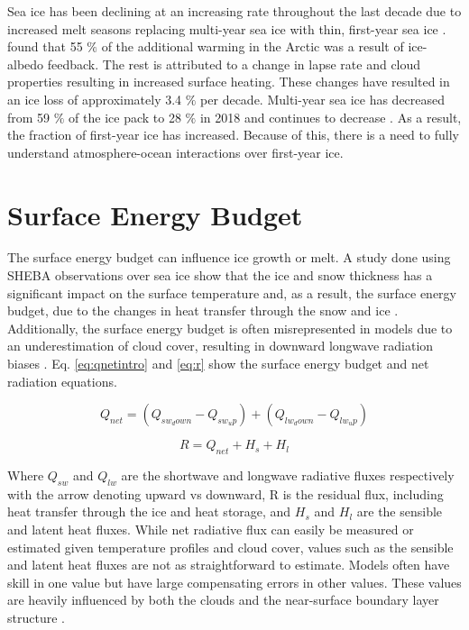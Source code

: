 Sea ice has been declining at an increasing rate throughout the last decade due to increased melt seasons replacing multi-year sea ice with thin, first-year sea ice \citep{meier:2014}. \citet{wunderling:2020} found that 55 $\%$ of the additional warming in the Arctic was a result of ice-albedo feedback. The rest is attributed to a change in lapse rate and cloud properties resulting in increased surface heating. These changes have resulted in an ice loss of approximately 3.4 $\%$ per decade. Multi-year sea ice has decreased from 59 $\%$ of the ice pack to 28 $\%$ in 2018 and continues to decrease \citep{stroeve:2018}. As a result, the fraction of first-year ice has increased.  Because of this, there is a need to fully understand atmosphere-ocean interactions over first-year ice. 

\section{Surface Energy Budget}
The surface energy budget can influence ice growth or melt. A study done using SHEBA observations over sea ice show that the ice and snow thickness has a significant impact on the surface temperature and, as a result, the surface energy budget, due to the changes in heat transfer through the snow and ice \citep{hines:2015}. Additionally, the surface energy budget is often misrepresented in models due to an underestimation of cloud cover, resulting in downward longwave radiation biases \citep{inoue:2008}. Eq. \ref{eq:qnetintro} and \ref{eq:r} show the surface energy budget and net radiation equations.

\begin{equation}\label{eq:qnetintrointro}
Q_{net} = (Q_{sw_down} - Q_{sw_up}) + (Q_{lw_down} - Q_{lw_up})
\end{equation}

\begin{equation}\label{eq:r}
R = Q_{net} + H_{s} + H_{l}
\end{equation}

Where $Q_{sw}$ and $Q_{lw}$ are the shortwave and longwave radiative fluxes respectively with the arrow denoting upward vs downward, R is the residual flux, including heat transfer through the ice and heat storage, and $H_{s}$ and $H_{l}$ are the sensible and latent heat fluxes. While net radiative flux can easily be measured or estimated given temperature profiles and cloud cover, values such as the sensible and latent heat fluxes are not as straightforward to estimate. Models often have skill in one value but have large compensating errors in other values. These values are heavily influenced by both the clouds and the near-surface boundary layer structure \citep{tjernstrom:2005}.

